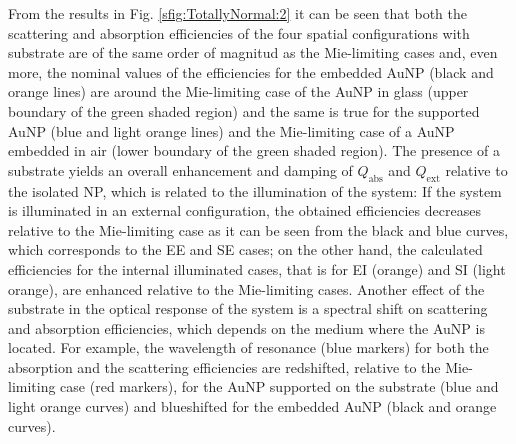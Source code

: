 From the results in Fig. \ref{sfig:TotallyNormal:2} it can be seen that both the scattering and absorption efficiencies of the four spatial configurations with substrate are of the same order of magnitud as the Mie-limiting cases and, even more, the nominal values of the efficiencies for the embedded AuNP (black and orange lines) are around the Mie-limiting case of the AuNP in glass (upper boundary of the green shaded region) and the same is true for the supported AuNP (blue and light orange lines) and the Mie-limiting case of a AuNP embedded in air (lower boundary of the green shaded region). The presence of a substrate yields an overall enhancement and damping of $Q_\text{abs}$ and $Q_\text{ext}$ relative to the isolated NP, which is related to the illumination of the system: If the system is illuminated in an external configuration, the obtained efficiencies decreases relative to the Mie-limiting case as it can be seen from the black  and blue curves, which corresponds to the EE and SE cases; on the other hand, the calculated efficiencies for the internal illuminated cases, that is for EI (orange) and SI (light orange), are enhanced relative to the Mie-limiting cases. Another effect of the substrate in the optical response of the system is a spectral shift on scattering and absorption efficiencies, which depends on the medium where the AuNP is located. For example, the wavelength of resonance (blue markers) for both the absorption and the scattering efficiencies are redshifted, relative to the Mie-limiting case (red markers), for the AuNP supported on the substrate (blue and light orange curves) and blueshifted for the embedded AuNP (black and orange curves).


